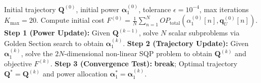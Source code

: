 \begin{algorithm}[t]
\caption{Time-Slotted Alternating Optimization (Joint AO)}
\label{alg:timeslot_ao}
\begin{algorithmic}[1]
\Require Initial trajectory $\mathbf{Q}^{(0)}$, initial power $\boldsymbol{\alpha}_1^{(0)}$, tolerance $\epsilon = 10^{-4}$, max iterations $K_{\max} = 20$.
\State Compute initial cost $F^{(0)} = \frac{1}{N} \sum_{n=1}^N OP_{\text{total}}(\alpha_1^{(0)}[n], \mathbf{q}_U^{(0)}[n])$.
    \State \textbf{Step 1 (Power Update):} Given $\mathbf{Q}^{(k-1)}$, solve $N$ scalar subproblems via Golden Section search to obtain $\boldsymbol{\alpha}_1^{(k)}$.
    \State \textbf{Step 2 (Trajectory Update):} Given $\boldsymbol{\alpha}_1^{(k)}$, solve the $2N$-dimensional non-linear SQP problem to obtain $\mathbf{Q}^{(k)}$ and objective $F^{(k)}$.
    \State \textbf{Step 3 (Convergence Test):}
        \State \textbf{break}; 
    \EndIf
\EndFor
\State \Return Optimal trajectory $\mathbf{Q}^* = \mathbf{Q}^{(k)}$ and power allocation $\boldsymbol{\alpha}_1^* = \boldsymbol{\alpha}_1^{(k)}$.
\end{algorithmic}
\end{algorithm}

